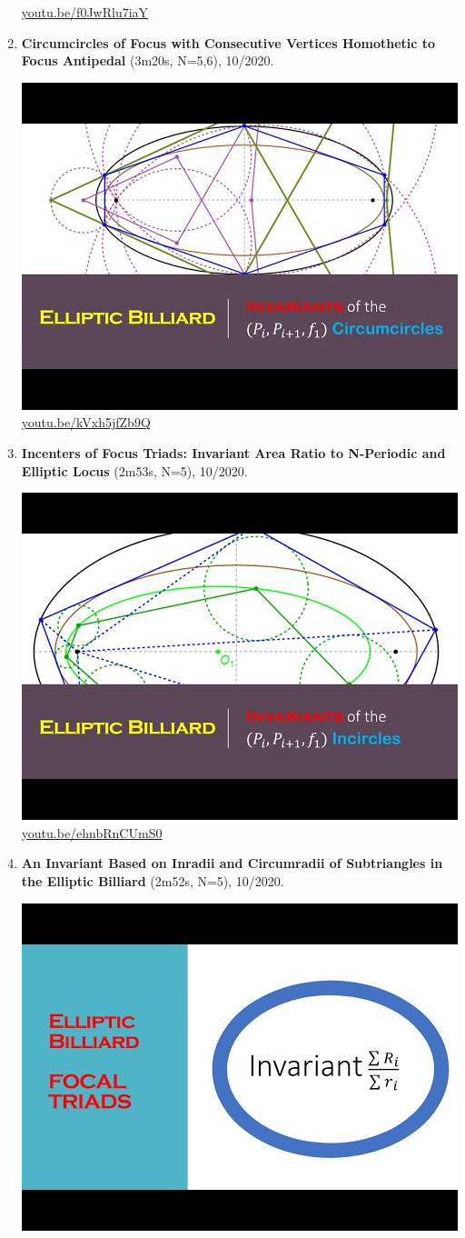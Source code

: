 \documentclass[12pt]{amsart}
\begin{document}
\begin{enumerate}[resume]
\begin{center}
\href{https://youtu.be/f0JwRlu7iaY}{\url{youtu.be/f0JwRlu7iaY}}\end{center}
% 
\item \textbf{Circumcircles of Focus with Consecutive Vertices Homothetic to Focus Antipedal} (3m20s, N=5,6), 10/2020. 
\begin{center}\includegraphics[width=.5\textwidth]{pics/kVxh5jfZb9Q.jpg} \\ 
\href{https://youtu.be/kVxh5jfZb9Q}{\url{youtu.be/kVxh5jfZb9Q}}\end{center}
% 
\item \textbf{Incenters of Focus Triads: Invariant Area Ratio to N-Periodic and Elliptic Locus} (2m53s, N=5), 10/2020. 
\begin{center}\includegraphics[width=.5\textwidth]{pics/ehnbRnCUmS0.jpg} \\ 
\href{https://youtu.be/ehnbRnCUmS0}{\url{youtu.be/ehnbRnCUmS0}}\end{center}
% 
\item \textbf{An Invariant Based on Inradii and Circumradii of Subtriangles in the Elliptic Billiard} (2m52s, N=5), 10/2020. 
\begin{center}\includegraphics[width=.5\textwidth]{pics/ipOEfbxWsdk.jpg} \\ 

\end{center}
\end{enumerate}
\end{document}
